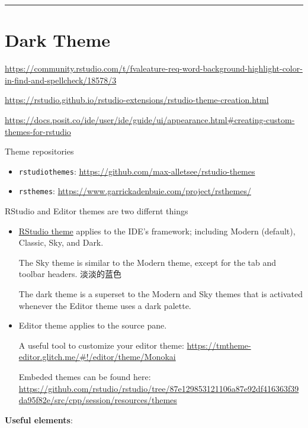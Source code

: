 \documentclass[
  a4paper,
  twoside,
  openright]{book}
\providecommand{\tightlist}{%
  \setlength{\itemsep}{0pt}\setlength{\parskip}{0pt}}
\theoremstyle{definition}
\theoremstyle{definition}
\theoremstyle{definition}
\theoremstyle{definition}
\theoremstyle{remark}
\begin{document}
\begin{center}\rule{0.5\linewidth}{0.5pt}\end{center}

\section{Dark Theme}\label{dark-theme}

\url{https://community.rstudio.com/t/fvaleature-req-word-background-highlight-color-in-find-and-spellcheck/18578/3}

\url{https://rstudio.github.io/rstudio-extensions/rstudio-theme-creation.html}

\url{https://docs.posit.co/ide/user/ide/guide/ui/appearance.html\#creating-custom-themes-for-rstudio}

Theme repositories

\begin{itemize}
\tightlist
\item
  \texttt{rstudiothemes}: \url{https://github.com/max-alletsee/rstudio-themes}
\item
  \texttt{rsthemes}: \url{https://www.garrickadenbuie.com/project/rsthemes/}
\end{itemize}

RStudio and Editor themes are two differnt things

\begin{itemize}
\item
  \href{https://support.posit.co/hc/en-us/articles/115011846747-Using-Themes-in-the-RStudio-IDE}{RStudio theme} applies to the IDE's framework; including Modern (default), Classic, Sky, and Dark.

  The Sky theme is similar to the Modern theme, except for the tab and toolbar headers. 淡淡的蓝色

  The dark theme is a superset to the Modern and Sky themes that is activated whenever the Editor theme uses a dark palette.
\item
  Editor theme applies to the source pane.

  A useful tool to customize your editor theme: \url{https://tmtheme-editor.glitch.me/\#!/editor/theme/Monokai}

  Embeded themes can be found here: \url{https://github.com/rstudio/rstudio/tree/87e129853121106a87e92df416363f39da95f82e/src/cpp/session/resources/themes}
\end{itemize}

\textbf{Useful elements}:
\end{document}
